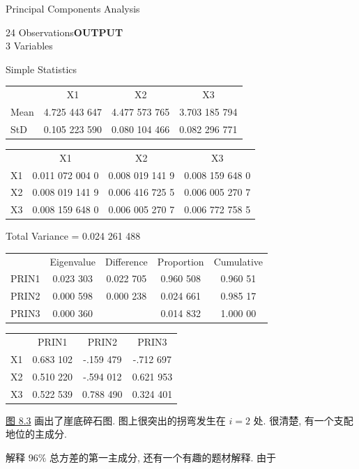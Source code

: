 
\begin{mvframe}[显示板 8.1(续)]
{\ttfamily\small
\begin{center}
Principal Components Analysis
\end{center}
24 Observations\hfill\textbf{\rmfamily OUTPUT}\\
3 Variables

\vspace{12pt}
\begin{center}
Simple Statistics

\vspace{4pt}
\begin{tabular}{lccc}
 & X1 & X2 & X3\\
Mean & 4.725 443 647 & 4.477 573 765 & 3.703 185 794\\
StD & 0.105 223 590 & 0.080 104 466 & 0.082 296 771
\end{tabular}
\end{center}

\vspace{12pt}
\begin{center}

\vspace{6pt}
\begin{tabular}{lccc}
 & X1 & X2 & X3\\
X1 & 0.011 072 004 0 & 0.008 019 141 9 & 0.008 159 648 0\\
X2 & 0.008 019 141 9 & 0.006 416 725 5 & 0.006 005 270 7\\
X3 & 0.008 159 648 0 & 0.006 005 270 7 & 0.006 772 758 5
\end{tabular}
\end{center}

\vspace{12pt}
\begin{center}
Total Variance = 0.024 261 488

\vspace{12pt}

\vspace{6pt}
\begin{tabular}{lcccc}
 & Eigenvalue & Difference & Proportion & Cumulative\\
PRIN1 & 0.023 303 & 0.022 705 & 0.960 508 & 0.960 51\\
PRIN2 & 0.000 598 & 0.000 238 & 0.024 661 & 0.985 17\\
PRIN3 & 0.000 360 & & 0.014 832 & 1.000 00
\end{tabular}

\vspace{12pt}

\vspace{6pt}
\begin{tabular}{lccc}
 & PRIN1 & PRIN2 & PRIN3\\
X1 & 0.683 102 & -.159 479 & -.712 697\\
X2 & 0.510 220 & -.594 012 & 0.621 953\\
X3 & 0.522 539 & 0.788 490 & 0.324 401
\end{tabular}
\end{center}
}
\end{mvframe}

\hyperref[fig:8.3]{图 8.3} 画出了崖底碎石图. 图上很突出的拐弯发生在 $i=2$ 处. 很清楚, 有一个支配地位的主成分.

解释 $96\%$ 总方差的第一主成分, 还有一个有趣的题材解释. 由于
